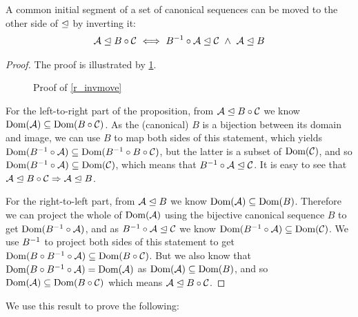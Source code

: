 \begin{mylem}\label{r_invmove}
A common initial segment of a set of canonical sequences can be moved 
to the other side of $\trianglelefteq$ by inverting it:
\begin{gather*}
{\mathcal{A}}\trianglelefteq{B\circ\mathcal{C}}
\ \Longleftrightarrow \ {B^{-1}\circ\mathcal{A}}\trianglelefteq{\mathcal{C}} 
\ \wedge \  {\mathcal{A}}\trianglelefteq{B}
\end{gather*}
\end{mylem}
\begin{proof}

The proof is illustrated by \cref{fig_invmove}.

\begin{figure}[htb]

\caption{Proof of \cref{r_invmove}}\label{fig_invmove}
\end{figure}

For the left-to-right part of the proposition,
from ${\mathcal{A}}\trianglelefteq{B\circ\mathcal{C}}$ we know $\textrm{Dom}({\mathcal{A}}) \subseteq \textrm{Dom}({B\circ\mathcal{C}})$.
As the (canonical) $B$ is a bijection between its domain and image,
we can use $B$ to map both sides of this statement, which yields
$\textrm{Dom}({B^{-1}\circ\mathcal{A}}) \subseteq \textrm{Dom}({B^{-1}\circ B\circ\mathcal{C}})$,
but the latter is a subset of $\textrm{Dom}({\mathcal{C}})$,
and so $\textrm{Dom}({B^{-1}\circ\mathcal{A}}) \subseteq \textrm{Dom}({\mathcal{C}})$,
which means that ${B^{-1}\circ\mathcal{A}}\trianglelefteq{\mathcal{C}}$.
It is easy to see that ${\mathcal{A}}\trianglelefteq{B\circ\mathcal{C}} \Rightarrow {\mathcal{A}}\trianglelefteq{B}$.

For the right-to-left part,
from ${\mathcal{A}}\trianglelefteq{B}$ we know $\textrm{Dom}({\mathcal{A}}) \subseteq \textrm{Dom}({B})$.
Therefore we can project the whole of $\textrm{Dom}({\mathcal{A}})$ using the bijective canonical sequence $B$
to get $\textrm{Dom}({B^{-1}\circ\mathcal{A}})$, and as ${B^{-1}\circ\mathcal{A}}\trianglelefteq{\mathcal{C}}$
we know
$\textrm{Dom}({B^{-1}\circ\mathcal{A}}) \subseteq \textrm{Dom}({\mathcal{C}})$.
We use $B^{-1}$ to project both sides of this statement to get
$\textrm{Dom}({B\circ B^{-1}\circ\mathcal{A}}) \subseteq \textrm{Dom}({B\circ\mathcal{C}})$.
But we also know that $\textrm{Dom}({B\circ B^{-1}\circ\mathcal{A}}) = \textrm{Dom}({\mathcal{A}})$
as $\textrm{Dom}({\mathcal{A}}) \subseteq \textrm{Dom}({B})$,
and so $\textrm{Dom}({\mathcal{A}}) \subseteq \textrm{Dom}({B\circ\mathcal{C}})$ which means
${\mathcal{A}}\trianglelefteq{B\circ\mathcal{C}}$.
\end{proof}

We use this result to prove the following:

